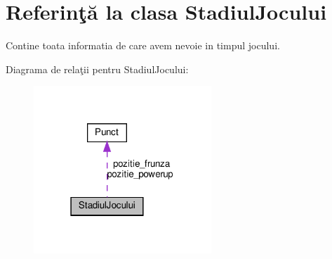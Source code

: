\hypertarget{classStadiulJocului}{}\section{Referinţă la clasa Stadiul\+Jocului}
\label{classStadiulJocului}


Contine toata informatia de care avem nevoie in timpul jocului.  




Diagrama de relaţii pentru Stadiul\+Jocului\+:
\nopagebreak
\begin{figure}[H]
\begin{center}
\leavevmode
\includegraphics[width=190pt]{classStadiulJocului__coll__graph}
\end{center}
\end{figure}
